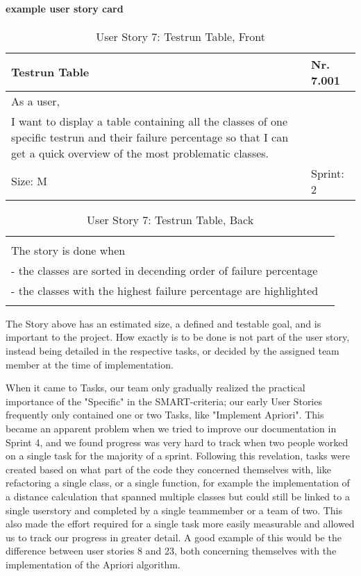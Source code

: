 \paragraph{example user story card} 
\begin{table}[h]
  \caption{User Story 7: Testrun Table, Front}
  \label{Story 7 Example}
  \centering
  \begin{tabular}{|p{9cm} p{2cm}|}
	\hline  	
  	Testrun Table & Nr. 7.001  \\ 
  	\hline
  	As a user, &    \\ 
  	I want to display a table containing all the classes of one specific testrun and their failure percentage so that I can get a quick overview of the most problematic classes. &    \\ 
  	Size: M & Sprint: 2 \\ 
  	\hline
  \end{tabular}
\end{table}
\begin{table}[h]
  \caption{User Story 7: Testrun Table, Back}
  \label{Story 7 Example}
  \centering
  \begin{tabular}{|p{10cm} p{1cm}|}
  	  &    \\ 
  	The story is done when &    \\ 
  	 - the classes are sorted in decending order of failure percentage &    \\ 
  	 - the classes with the highest failure percentage are highlighted &   \\ 
  	 
  	  &  
  	   \\ 
  	\hline
  \end{tabular}
\end{table}

The Story above has an estimated size, a defined and testable goal, and is important to the project. How exactly is to be done is not part of the user story, instead being detailed in the respective tasks, or decided by the assigned team member at the time of implementation. 


When it came to Tasks, our team only gradually realized the practical importance of the "Specific" in the SMART-criteria; our early User Stories frequently only contained one or two Tasks, like "Implement Apriori". This became an apparent problem when we tried to improve our documentation in Sprint 4, and we found progress was very hard to track when two people worked on a single task for the majority of a sprint. 
Following this revelation, tasks were created based on what part of the code they concerned themselves with, like refactoring a single class, or a single function, for example the implementation of a distance calculation that spanned multiple classes but could still be linked to a single userstory and completed by a single teammember or a team of two. 
This also made the effort required for a single task more easily measurable and allowed us to track our progress in greater detail. A good example of this would be the difference between user stories 8 and 23, both concerning themselves with the implementation of the Apriori algorithm.

